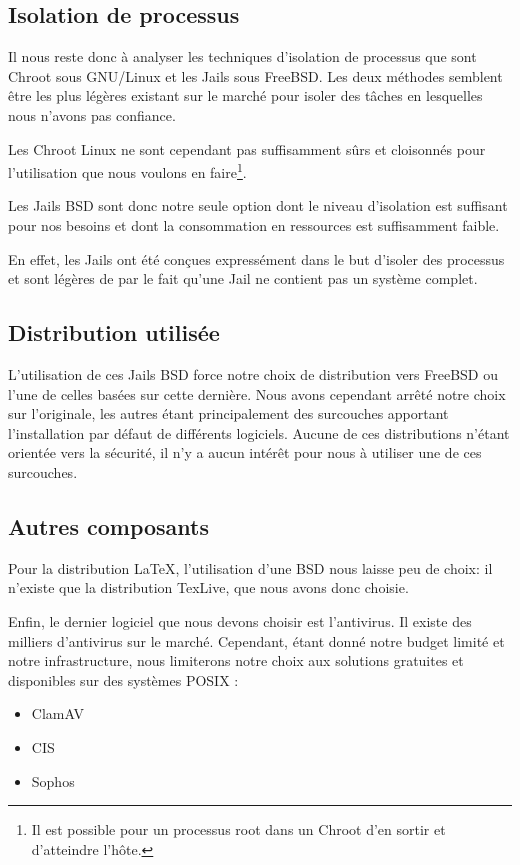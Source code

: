 \documentclass[10pt,a4paper]{article}
\begin{document}
\subsection{Isolation de processus}

Il nous reste donc à analyser les techniques d'isolation de processus que sont Chroot sous GNU/Linux et les Jails sous FreeBSD.
Les deux méthodes semblent être les plus légères existant sur le marché pour isoler des tâches en lesquelles nous n'avons pas confiance.

Les Chroot Linux ne sont cependant pas suffisamment sûrs et cloisonnés pour l'utilisation que nous voulons en faire\footnote{Il est possible pour un processus root dans un Chroot d'en sortir et d'atteindre l'hôte.}.

Les Jails BSD sont donc notre seule option dont le niveau d'isolation est suffisant pour nos besoins et dont la consommation en ressources est suffisamment faible.

En effet, les Jails ont été conçues expressément dans le but d'isoler des processus et sont légères de par le fait qu'une Jail ne contient pas un système complet.

\subsection{Distribution utilisée}

L'utilisation de ces Jails BSD force notre choix de distribution vers FreeBSD ou l'une de celles basées sur cette dernière. Nous avons cependant arrêté notre choix sur l'originale, les autres étant principalement des surcouches apportant l'installation par défaut de différents logiciels. Aucune de ces distributions n'étant orientée vers la sécurité, il n'y a aucun intérêt pour nous à utiliser une de ces surcouches.

\subsection{Autres composants}
\label{jail}

Pour la distribution \LaTeX, l'utilisation d'une BSD nous laisse peu de choix: il n'existe que la distribution TexLive, que nous avons donc choisie.

Enfin, le dernier logiciel que nous devons choisir est l'antivirus. Il existe des milliers d'antivirus sur le marché. Cependant, étant donné notre budget limité et notre infrastructure, nous limiterons notre choix aux solutions gratuites et disponibles sur des systèmes POSIX :
\begin{itemize}
    \item{ClamAV}
    \item{CIS}
    \item{Sophos}
\end{itemize}
\end{document}

